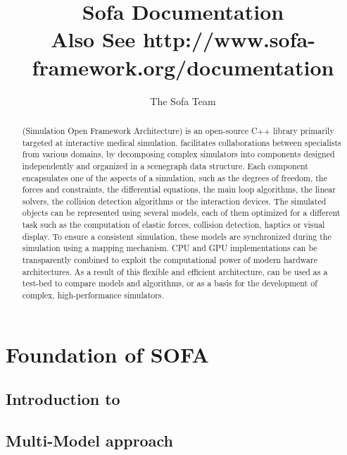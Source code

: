 \documentclass[a4paper,10pt]{report}
\title{Sofa Documentation\\
\vspace{10mm}\normalsize{Also See \bf{http://www.sofa-framework.org/documentation} } }
\author{The Sofa Team}
\begin{document}
\maketitle

\begin{abstract}	
\sofa{} (Simulation Open Framework Architecture) is an open-source C++ library primarily  targeted at interactive medical simulation.
\sofa{} facilitates collaborations between specialists from various domains, by decomposing complex simulators into components designed independently and organized in a scenegraph data structure.
Each component encapsulates one of the aspects of a simulation, such as the degrees of freedom, the forces and constraints, the differential equations, the main loop algorithms, the linear solvers, the collision detection algorithms or the interaction devices. The simulated objects can be represented using several models, each of them optimized for a different task such as the computation of elastic forces, collision detection, haptics or visual display. To ensure a consistent simulation, these models are synchronized during the simulation using a mapping mechanism.
CPU and GPU implementations can be transparently combined to exploit the computational power of modern hardware architectures.
As a result of this flexible and efficient architecture, \sofa{} can be used as a test-bed to compare models and algorithms, or as a basis for the development of complex, high-performance simulators.

\end{abstract}

\tableofcontents

\part{Foundation of SOFA}

\chapter{Introduction to \sofa}

\graphicspath{{../introduction/}}  %


\chapter{Multi-Model approach}
\graphicspath{{../multimodel/}}  %


\end{document}
